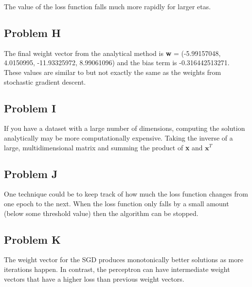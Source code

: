 \documentclass[12pt]{article} %
\begin{document}
The value of the loss function falls much more rapidly for larger etas.

\subsection{Problem H}
The final weight vector from the analytical method is \textbf{w} = (-5.99157048, 4.0150995, -11.93325972, 8.99061096) and the bias term is -0.316442513271. These values are similar to but not exactly the same as the weights from stochastic gradient descent.

\subsection{Problem I}
If you have a dataset with a large number of dimensions, computing the solution analytically may be more computationally expensive. Taking the inverse of a large, multidimensional matrix and summing the product of \textbf{x} and $\textbf{x}^T$



\subsection{Problem J}
One technique could be to keep track of how much the loss function changes from one epoch to the next. When the loss function only falls by a small amount (below some threshold value) then the algorithm can be stopped.

\subsection{Problem K}
The weight vector for the SGD produces monotonically better solutions as more iterations happen. In contrast, the perceptron can have intermediate weight vectors that have a higher loss than previous weight vectors.
\end{document}
